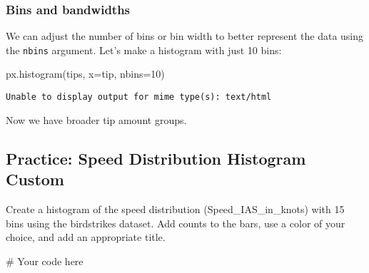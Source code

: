\documentclass[
  letterpaper,
  DIV=11,
  numbers=noendperiod]{scrreprt}
\newenvironment{Shaded}{\begin{snugshade}}{\end{snugshade}}
\newcommand{\CommentTok}[1]{\textcolor[rgb]{0.37,0.37,0.37}{#1}}
\newcommand{\DecValTok}[1]{\textcolor[rgb]{0.68,0.00,0.00}{#1}}
\newcommand{\NormalTok}[1]{\textcolor[rgb]{0.00,0.23,0.31}{#1}}
\newcommand{\OperatorTok}[1]{\textcolor[rgb]{0.37,0.37,0.37}{#1}}
\newcommand{\StringTok}[1]{\textcolor[rgb]{0.13,0.47,0.30}{#1}}
\begin{document}
\subsubsection{Bins and bandwidths}\label{bins-and-bandwidths}

We can adjust the number of bins or bin width to better represent the
data using the \texttt{nbins} argument. Let's make a histogram with just
10 bins:

\begin{Shaded}
\begin{Highlighting}[]
\NormalTok{px.histogram(tips, x}\OperatorTok{=}\StringTok{\textquotesingle{}tip\textquotesingle{}}\NormalTok{, nbins}\OperatorTok{=}\DecValTok{10}\NormalTok{)}
\end{Highlighting}
\end{Shaded}

\begin{verbatim}
Unable to display output for mime type(s): text/html
\end{verbatim}

Now we have broader tip amount groups.

\begin{tcolorbox}[enhanced jigsaw, colframe=quarto-callout-tip-color-frame, opacityback=0, titlerule=0mm, bottomrule=.15mm, breakable, leftrule=.75mm, colbacktitle=quarto-callout-tip-color!10!white, title=\textcolor{quarto-callout-tip-color}{\faLightbulb}\hspace{0.5em}{Practice}, rightrule=.15mm, coltitle=black, opacitybacktitle=0.6, colback=white, left=2mm, arc=.35mm, toptitle=1mm, bottomtitle=1mm, toprule=.15mm]

\subsection{Practice: Speed Distribution Histogram
Custom}\label{practice-speed-distribution-histogram-custom}

Create a histogram of the speed distribution (Speed\_IAS\_in\_knots)
with 15 bins using the birdstrikes dataset. Add counts to the bars, use
a color of your choice, and add an appropriate title.

\begin{Shaded}
\begin{Highlighting}[]
\CommentTok{\# Your code here}
\end{Highlighting}
\end{Shaded}

\end{tcolorbox}
\end{document}
